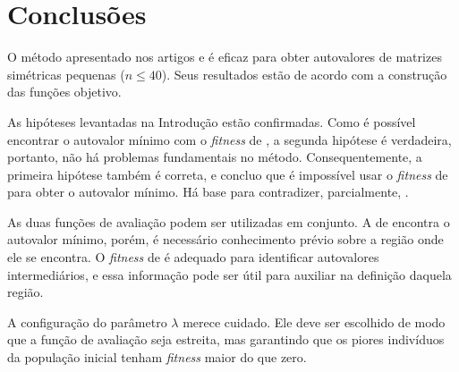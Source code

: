 \chapter{Conclusões}
\label{cap:conclusao}

	O método apresentado nos artigos \cite{metodo2004} e \cite{metodo2011} é eficaz para obter autovalores de matrizes simétricas pequenas ($n \leq 40$). Seus resultados estão de acordo com a construção das funções objetivo.
	
	As hipóteses levantadas na Introdução estão confirmadas. Como é possível encontrar o autovalor mínimo com o \emph{fitness} de \cite{metodo2011}, a segunda hipótese é verdadeira, portanto, não há problemas fundamentais no método. Consequentemente, a primeira hipótese também é correta, e concluo que é impossível usar o \emph{fitness} de \cite{metodo2004} para obter o autovalor mínimo. Há base para contradizer, parcialmente, \cite{metodo2004}.
	
	As duas funções de avaliação podem ser utilizadas em conjunto. A de \cite{metodo2011} encontra o autovalor mínimo, porém, é necessário conhecimento prévio sobre a região onde ele se encontra. O \emph{fitness} de \cite{metodo2004} é adequado para identificar autovalores intermediários, e essa informação pode ser útil para auxiliar na definição daquela região.
	
	A configuração do parâmetro $\lambda$ merece cuidado. Ele deve ser escolhido de modo que a função de avaliação seja estreita, mas garantindo que os piores indivíduos da população inicial tenham \emph{fitness} maior do que zero.